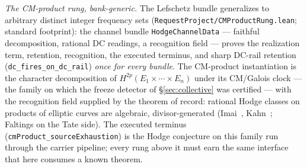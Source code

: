 \documentclass[11pt]{article}
\theoremstyle{definition}
\theoremstyle{remark}
\begin{document}
\emph{The CM-product rung, bank-generic.} The Lefschetz bundle generalizes to
arbitrary distinct integer frequency sets
(\texttt{RequestProject/CMProductRung.lean}; standard footprint): the channel
bundle \texttt{HodgeChannelData} --- faithful decomposition, rational DC
readings, a recognition field --- proves the realization term, retention,
recognition, the executed terminus, and sharp DC-rail retention
(\texttt{dc\_fires\_on\_dc\_rail}) \emph{once for every bundle}. The
CM-product instantiation is the character decomposition of
$H^{2p}(E_1\times\cdots\times E_n)$ under its CM/Galois clock --- the family
on which the freeze detector of \S\ref{sec:collective} was certified --- with
the recognition field supplied by the theorem of record: rational Hodge
classes on products of elliptic curves are algebraic, divisor-generated
(Imai~\cite{Imai}, Kahn~\cite{KahnHodge}; Faltings on the Tate side). The
executed terminus (\texttt{cmProduct\_sourceExhaustion}) is the Hodge
conjecture on this family run through the carrier pipeline; every rung above
it must earn the same interface that here consumes a known theorem.
\end{document}
